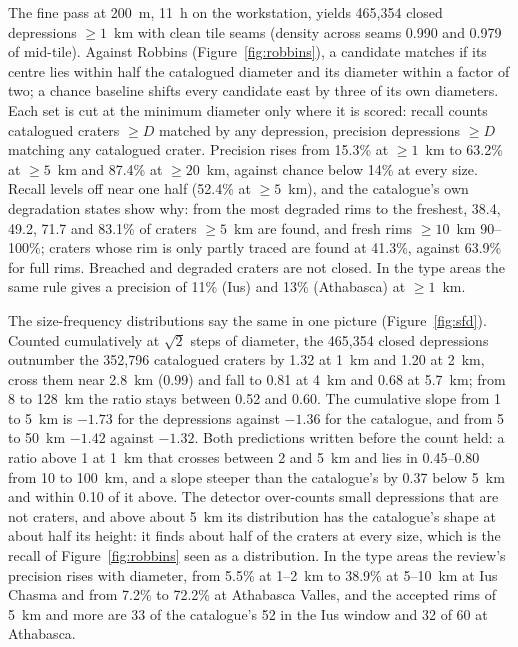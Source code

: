 \documentclass[twocolumn]{aastex701}
\begin{document}
The fine pass at 200~m, 11~h on the workstation, yields 465,354 closed depressions $\ge1$~km with clean tile seams
(density across seams 0.990 and 0.979 of mid-tile). Against Robbins (Figure~\ref{fig:robbins}), a candidate matches if
its centre lies within half the catalogued diameter and its diameter within a factor of two; a chance baseline shifts
every candidate east by three of its own diameters. Each set is cut at the minimum diameter only where it is scored:
recall counts catalogued craters $\ge D$ matched by any depression, precision depressions $\ge D$ matching any
catalogued crater. Precision rises from 15.3\% at $\ge1$~km to 63.2\% at $\ge5$~km and 87.4\% at $\ge20$~km, against
chance below 14\% at every size. Recall levels off near one half (52.4\% at $\ge5$~km), and the catalogue's own
degradation states \citep{Robbins2012} show why: from the most degraded rims to the freshest, 38.4, 49.2, 71.7 and
83.1\% of craters $\ge5$~km are found, and fresh rims $\ge10$~km 90--100\%; craters whose rim is only partly traced
are found at 41.3\%, against 63.9\% for full rims. Breached and degraded craters are not closed. In the type areas
the same rule gives a precision of 11\% (Ius) and 13\% (Athabasca) at $\ge1$~km. %

The size-frequency distributions say the same in one picture (Figure~\ref{fig:sfd}). Counted cumulatively at
$\sqrt{2}$ steps of diameter, the 465,354 closed depressions outnumber the 352,796 catalogued craters by 1.32 at
1~km and 1.20 at 2~km, cross them near 2.8~km (0.99) and fall to 0.81 at 4~km and 0.68 at 5.7~km; from 8 to 128~km
the ratio stays between 0.52 and 0.60. The cumulative slope from 1 to 5~km is $-1.73$ for the depressions against
$-1.36$ for the catalogue, and from 5 to 50~km $-1.42$ against $-1.32$. Both predictions written before the count
held: a ratio above 1 at 1~km that crosses between 2 and 5~km and lies in 0.45--0.80 from 10 to 100~km, and a slope
steeper than the catalogue's by 0.37 below 5~km and within 0.10 of it above. The detector over-counts small
depressions that are not craters, and above about 5~km its distribution has the catalogue's shape at about half its
height: it finds about half of the craters at every size, which is the recall of Figure~\ref{fig:robbins} seen as a
distribution. In the type areas the review's precision rises with diameter, from 5.5\% at 1--2~km to 38.9\% at
5--10~km at Ius Chasma and from 7.2\% to 72.2\% at Athabasca Valles, and the accepted rims of 5~km and more are 33 of
the catalogue's 52 in the Ius window and 32 of 60 at Athabasca. %
\end{document}
